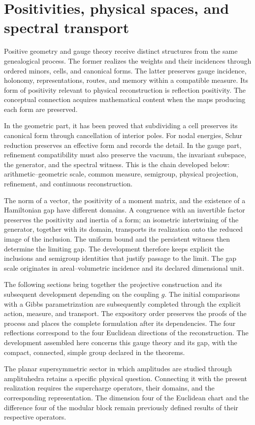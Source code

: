 \section{Positivities, physical spaces, and spectral transport}
Positive geometry and gauge theory receive distinct structures from
the same genealogical process. The former realizes the weights and their
incidences through ordered minors, cells, and canonical forms.
The latter preserves gauge incidence, holonomy,
representations, routes, and memory within a compatible measure.
Its form of positivity relevant to physical reconstruction is
reflection positivity. The conceptual connection acquires mathematical
content when the maps producing each form are preserved.

In the geometric part, it has been proved that subdividing a cell
preserves its canonical form through cancellation of interior poles.
For nodal energies, Schur reduction preserves an effective
form and records the detail. In the gauge part, refinement
compatibility must also preserve the vacuum, the invariant subspace,
the generator, and the spectral witness. This is the chain developed
below: arithmetic--geometric scale, common measure, semigroup,
physical projection, refinement, and continuous reconstruction.

The norm of a vector, the positivity of a moment matrix, and the
existence of a Hamiltonian gap have different domains.
A congruence with an invertible factor preserves the positivity and
inertia of a form; an isometric intertwining of the generator, together
with its domain, transports its realization onto the reduced image of the
inclusion. The uniform bound and the persistent witness then determine the
limiting gap. The development therefore keeps explicit the
inclusions and semigroup identities that justify passage to the
limit. The gap scale originates in areal--volumetric incidence
and its declared dimensional unit.

The following sections bring together the projective construction and its
subsequent development depending on the coupling \(g\). The initial
comparisons with a Gibbs parametrization are subsequently completed through
the explicit action, measure, and transport. The expository order
preserves the proofs of the process and places the complete formulation
after its dependencies. The four reflections correspond to the four
Euclidean directions of the reconstruction. The development assembled here
concerns this gauge theory and its gap, with the compact,
connected, simple group declared in the theorems.

The planar supersymmetric sector in which amplitudes are studied through
amplituhedra retains a specific physical question. Connecting it with
the present realization requires the supercharge operators, their
domains, and the corresponding representation. The dimension four of the
Euclidean chart and the difference four of the modular block remain
previously defined results of their respective operators.
